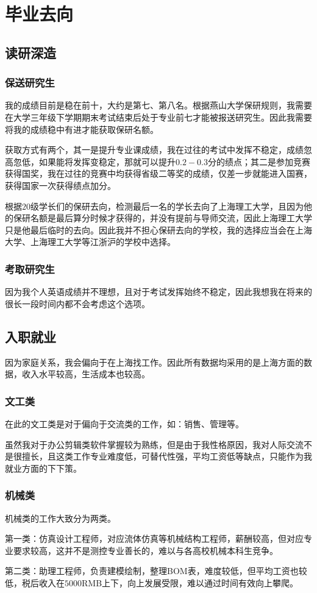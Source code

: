 \documentclass{ctexart}
\begin{document}
	\section{毕业去向}
		\subsection{读研深造}
			\subsubsection{保送研究生}
				我的成绩目前是稳在前十，大约是第七、第八名。根据燕山大学保研规则，我需要在大学三年级下学期期末考试结束后处于专业前七才能被报送研究生。因此我需要将我的成绩稳中有进才能获取保研名额。\par
				获取方式有两个，其一是提升专业课成绩，我在过往的考试中发挥不稳定，成绩忽高忽低，如果能将发挥变稳定，那就可以提升$0.2-0.3$分的绩点；其二是参加竞赛获得国奖，我在过往的竞赛中均获得省级二等奖的成绩，仅差一步就能进入国赛，获得国家一次获得绩点加分。\par
				根据$20$级学长们的保研去向，检测最后一名的学长去向了上海理工大学，且因为他的保研名额是最后算分时候才获得的，并没有提前与导师交流，因此上海理工大学只是他最后临时的去向。因此我并不担心保研去向的学校，我的选择应当会在上海大学、上海理工大学等江浙沪的学校中选择。
			\subsubsection{考取研究生}
				因为我个人英语成绩并不理想，且对于考试发挥始终不稳定，因此我想我在将来的很长一段时间内都不会考虑这个选项。
		\subsection{入职就业}
			因为家庭关系，我会偏向于在上海找工作。因此所有数据均采用的是上海方面的数据，收入水平较高，生活成本也较高。
			\subsubsection{文工类}
				在此的文工类是对于偏向于交流类的工作，如：销售、管理等。\par
				虽然我对于办公剪辑类软件掌握较为熟练，但是由于我性格原因，我对人际交流不是很擅长，且这类工作专业难度低，可替代性强，平均工资低等缺点，只能作为我就业方面的下下策。
			\subsubsection{机械类}
				机械类的工作大致分为两类。\par
				第一类：仿真设计工程师，对应流体仿真等机械结构工程师，薪酬较高，但对应专业要求较高，这并不是测控专业善长的，难以与各高校机械本科生竞争。\par
				第二类：助理工程师，负责建模绘制，整理BOM表，难度较低，但平均工资也较低，税后收入在$5000$RMB上下，向上发展受限，难以通过时间有效向上攀爬。
\end{document}
